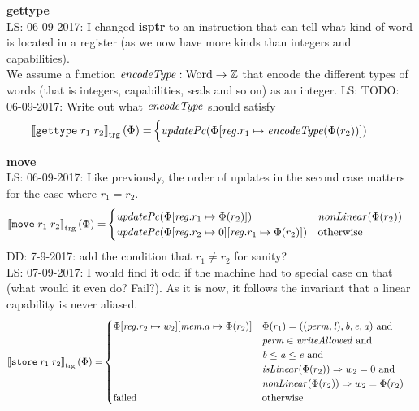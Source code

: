 \documentclass[a4paper]{article}
\newcommand\lau[1]{{\color{purple} \sf \footnotesize {LS: #1}}\\}
\newcommand\dominique[1]{{\color{purple} \sf \footnotesize {DD: #1}}\\}
\newcommand{\sem}[1]{\left\llbracket #1 \right\rrbracket}
\newcommand{\tsem}[2][\Phi]{\sem{#2}_{\mathrm{trg}}(#1)}
\newcommand{\tand}{\text{ and }}
\newcommand{\totherwise}{\text{otherwise }}
\newcommand{\targetcolor}[1]{\color{black}}
\newcommand{\trg}[1]{{\targetcolor{} #1}}
\newcommand{\zinstr}[1]{\texttt{#1}}
\newcommand{\twoinstr}[3]{
  \ifthenelse{\equal{#2#3}{}}
  {\zinstr{#1}}
  {\zinstr{#1} \; #2 \; #3}
}
\newcommand{\tisptr}[2]{\twoinstr{\trg{gettype}}{#1}{#2}}
\newcommand{\tmove}[2]{\twoinstr{\trg{move}}{#1}{#2}}
\newcommand{\tstore}[2]{\twoinstr{\trg{store}}{#1}{#2}}
\newcommand{\ints}{\mathbb{Z}}
\newcommand{\update}[2]{[#1 \mapsto #2]}
\newcommand{\updReg}[2]{\update{\reg.#1}{#2}}
\newcommand{\shareddom}[1]{\mathrm{#1}}
\newcommand{\Word}{\shareddom{Word}}
\newcommand{\perm}{\var{perm}}
\newcommand{\lin}{\var{l}}
\newcommand{\failed}{\mathrm{failed}}
\newcommand{\var}[1]{\mathit{#1}}
\newcommand{\reg}{\var{reg}}
\newcommand{\mem}{\var{mem}}
\newcommand{\baddr}{\var{b}}
\newcommand{\eaddr}{\var{e}}
\newcommand{\aaddr}{\var{a}}
\newcommand{\plainfun}[2]{
  \ifthenelse{\equal{#2}{}}
  {\mathit{#1}}
  {\mathit{#1}(#2)}
}
\newcommand{\encType}[1]{\plainfun{encodeType}{#1}}
\newcommand{\updPcAddr}[1]{\plainfun{updatePc}{#1}}
\newcommand{\writeAllowed}[1]{\plainfun{writeAllowed}{#1}}
\newcommand{\nonLinear}[1]{\plainfun{nonLinear}{#1}}
\newcommand{\isLinear}[1]{\plainfun{isLinear}{#1}}
\begin{document}
\textbf{gettype}\\
\lau{06-09-2017: I changed \textbf{isptr} to an instruction that can tell what kind of word is located in a register (as we now have more kinds than integers and capabilities).}
We assume a function $\encType{} : \Word \rightarrow \ints$ that encode the different types of words (that is integers, capabilities, seals and so on) as an integer.
\lau{TODO: 06-09-2017: Write out what $\encType{}$ should satisfy}
\begin{align*}
  \tsem{\tisptr{r_1}{r_2}} = & 
                               \begin{cases}
                                 \updPcAddr{}(\Phi\updReg{r_1}{\encType{\Phi(r_2)}})
                               \end{cases}
\end{align*}

\textbf{move}\\
\lau{06-09-2017: Like previously, the order of updates in the second case matters for the case where $r_1 = r_2$.}
\begin{align*}
  \tsem{\tmove{r_1}{r_2}} = & 
                              \begin{cases}
                                \updPcAddr{\Phi\updReg{r_1}{\Phi(r_2)}} & \nonLinear{\Phi(r_2)}\\
                                \updPcAddr{\Phi\updReg{r_2}{0}\updReg{r_1}{\Phi(r_2)}} & \totherwise 
                              \end{cases}
\end{align*}
\dominique{7-9-2017: add the condition that $r_1 \neq r_2$ for sanity?}
\lau{07-09-2017: I would find it odd if the machine had to special case on that (what would it even do? Fail?). As it is now, it follows the invariant that a linear capability is never aliased.}

\begin{align*}
  \tsem{\tstore{r_1}{r_2}} = & 
                               \begin{cases}
                                 \Phi\updReg{r_2}{w_2}
                                     \update{\mem.a}{\Phi(r_2)} & \arraycolsep=0pt
                                     \begin{array}[t]{l}
                                       \Phi(r_1) = ((\perm,\lin),\baddr,\eaddr,\aaddr) \tand \\
                                       \perm \in \writeAllowed{} \tand \\
                                       \baddr \leq \aaddr \leq \eaddr \tand \\
                                       \isLinear{\Phi(r_2)} \Rightarrow w_2 = 0 \tand \\
                                       \nonLinear{\Phi(r_2)} \Rightarrow w_2 = \Phi(r_2)
                                     \end{array} \\
                                  \failed & \totherwise
                               \end{cases}
\end{align*}
\end{document}
